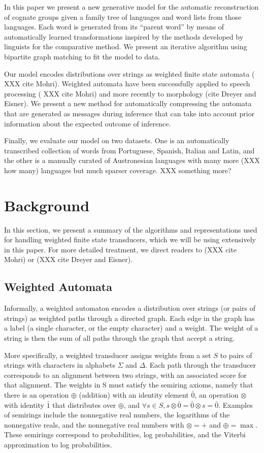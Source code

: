 \documentclass[11pt,a4paper]{article}
\begin{document}
In this paper we present a new generative model for the automatic
reconstruction of cognate groups given a family tree of languages
and word lists from those languages. Each word is generated from
its ``parent word'' by means of automatically learned transformations
inspired by the methods developed by linguists for the comparative
method. We present an iterative algorithm using bipartite graph matching
to fit the model to data.

Our model encodes distributions over strings as weighted finite
state automata ( XXX cite Mohri). Weighted automata have been
successfully applied to speech processing ( XXX cite Mohri) and
more recently to morphology (cite Dreyer and Eisner).  We present
a new method for automatically compressing the automata that are
generated as messages during inference that can take into account
prior information about the expected outcome of inference.

Finally, we evaluate our model on two datasets. One is an automatically
transcribed collection of words from Portuguese, Spanish, Italian
and Latin, and the other is a manually curated of Austronesian
languages with many more (XXX how many) languages but much sparser
coverage. XXX something more?

\section{Background}

In this section, we present a summary of the algorithms and
representations used for handling weighted finite state transducers,
which we will be using extensively in this paper. For more detailed
treatment, we direct readers to (XXX cite Mohri) or (XXX cite Dreyer
and Eisner).

\subsection{Weighted Automata}

Informally, a weighted automaton encodes a distribution over strings
(or pairs of strings) as weighted paths through a directed graph.
Each edge in the graph has a label (a single character, or the empty
character) and a weight. The weight of a string is then the sum
of all paths through the graph that accept a string.

More specifically, a weighted transducer assigns weights from a set
$S$ to pairs of strings with characters in alphabets $\Sigma$ and
$\Delta$. Each path through the transducer corresponds to an alignment
between two strings, with an associated score for that alignment.
The weights in S must satisfy the semiring axioms, namely that there
is an operation $\oplus$ (addition) with an identity element $\bar
0$, an operation $\otimes$ with identity $\bar 1$ that distributes
over $\oplus$, and $\forall s\in S, s\otimes \bar 0 = \bar 0 \otimes
s = \bar 0$. Examples of semirings include the nonnegative real
numbers, the logarithms of the nonnegative reals, and the nonnegative
real numbers with $\otimes = +$ and $\oplus = \max$. These semirings
correspond to probabilities, log probabilities, and the Viterbi
approximation to log probabilities.
\end{document}
